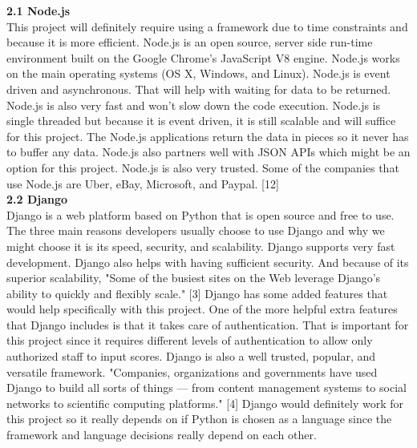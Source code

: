 \documentclass[letterpaper,10pt,draftclsnofoot,onecolumn,]{IEEEtran}
\begin{document}
\textbf{2.1 Node.js}\\
This project will definitely require using a framework due to time constraints and because it is more efficient. Node.js is an open source, server side run-time environment built on the Google Chrome's JavaScript V8 engine. Node.js works on the main operating systems (OS X, Windows, and Linux). Node.js is event driven and asynchronous. That will help with waiting for data to be returned. Node.js is also very fast and won't slow down the code execution. Node.js is single threaded but because it is event driven, it is still scalable and will suffice for this project. The Node.js applications return the data in pieces so it never has to buffer any data. Node.js also partners well with JSON APIs which might be an option for this project. Node.js is also very trusted. Some of the companies that use Node.js are Uber, eBay, Microsoft, and Paypal. [12]\\

\textbf{2.2 Django}\\
Django is a web platform based on Python that is open source and free to use. The three main reasons developers usually choose to use Django and why we might choose it is its speed, security, and scalability. Django supports very fast development. Django also helps with having sufficient security. And because of its superior scalability, "Some of the busiest sites on the Web leverage Django’s ability to quickly and flexibly scale." [3] Django has some added features that would help specifically with this project. One of the more helpful extra features that Django includes is that it takes care of authentication. That is important for this project since it requires different levels of authentication to allow only authorized staff to input scores. Django is also a well trusted, popular, and versatile framework. "Companies, organizations and governments have used Django to build all sorts of things — from content management systems to social networks to scientific computing platforms." [4] Django would definitely work for this project so it really depends on if Python is chosen as a language since the framework and language decisions really depend on each other.\\ 
\end{document}
